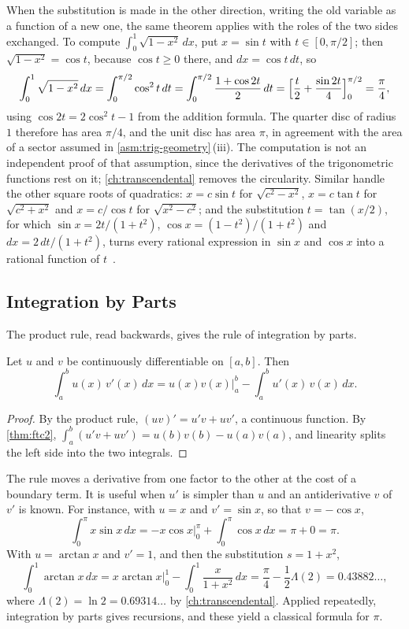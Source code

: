 When the substitution is made in the other direction, writing the old variable as a function of a new one, the same theorem applies with the roles of the two sides exchanged. To compute $\int_0^1\sqrt{1-x^2}\,dx$, put $x=\sin t$ with $t\in[0,\pi/2]$; then $\sqrt{1-x^2}=\cos t$, because $\cos t\ge0$ there, and $dx=\cos t\,dt$, so
\[
\int_0^1\sqrt{1-x^2}\,dx=\int_0^{\pi/2}\cos^2t\,dt=\int_0^{\pi/2}\frac{1+\cos2t}2\,dt=\Bigl[\frac t2+\frac{\sin2t}4\Bigr]_0^{\pi/2}=\frac\pi4 ,
\]
using $\cos2t=2\cos^2t-1$ from the addition formula. The quarter disc of radius $1$ therefore has area $\pi/4$, and the unit disc has area $\pi$, in agreement with the area of a sector assumed in \cref{asm:trig-geometry}\,(iii). The computation is not an independent proof of that assumption, since the derivatives of the trigonometric functions rest on it; \cref{ch:transcendental} removes the circularity. Similar  handle the other square roots of quadratics: $x=c\sin t$ for $\sqrt{c^2-x^2}$, $x=c\tan t$ for $\sqrt{c^2+x^2}$ and $x=c/\cos t$ for $\sqrt{x^2-c^2}$; and the substitution $t=\tan(x/2)$, for which $\sin x=2t/(1+t^2)$, $\cos x=(1-t^2)/(1+t^2)$ and $dx=2\,dt/(1+t^2)$, turns every rational expression in $\sin x$ and $\cos x$ into a rational function of $t$~\cite{spivak2008calculus}.

\subsection{Integration by Parts}

The product rule, read backwards, gives the rule of integration by parts.

\begin{theorem}
\label{thm:parts}
Let $u$ and $v$ be continuously differentiable on $[a,b]$. Then
\[
\int_a^bu(x)\,v'(x)\,dx=u(x)v(x)\Big|_a^b-\int_a^bu'(x)\,v(x)\,dx .
\]
\end{theorem}

\begin{proof}
By the product rule, $(uv)'=u'v+uv'$, a continuous function. By \cref{thm:ftc2}, $\int_a^b(u'v+uv')=u(b)v(b)-u(a)v(a)$, and linearity splits the left side into the two integrals.
\end{proof}

The rule moves a derivative from one factor to the other at the cost of a boundary term. It is useful when $u'$ is simpler than $u$ and an antiderivative $v$ of $v'$ is known. For instance, with $u=x$ and $v'=\sin x$, so that $v=-\cos x$,
\[
\int_0^\pi x\sin x\,dx=-x\cos x\Big|_0^\pi+\int_0^\pi\cos x\,dx=\pi+0=\pi .
\]
With $u=\arctan x$ and $v'=1$, and then the substitution $s=1+x^2$,
\[
\int_0^1\arctan x\,dx=x\arctan x\Big|_0^1-\int_0^1\frac x{1+x^2}\,dx=\frac\pi4-\frac12\Lambda(2)=0.43882\ldots,
\]
where $\Lambda(2)=\ln2=0.69314\ldots$ by \cref{ch:transcendental}. Applied repeatedly, integration by parts gives recursions, and these yield a classical formula for $\pi$.


